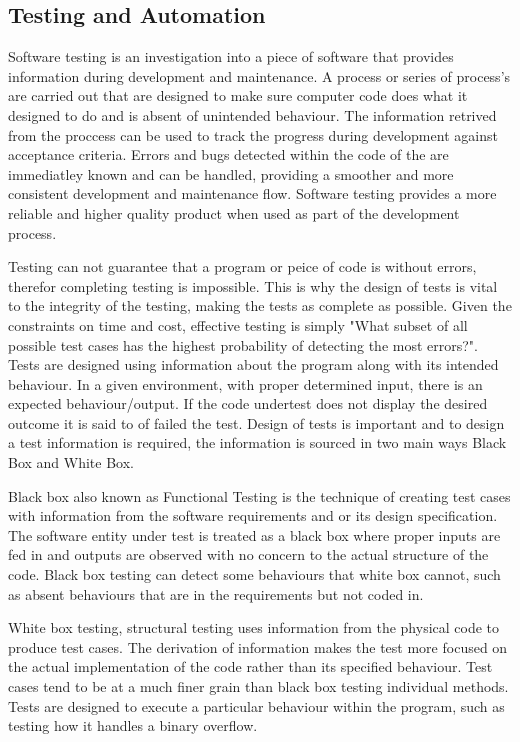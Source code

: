 \documentclass{article}
\begin{document}
\subsection{Testing and Automation}
\par Software testing is an investigation into a piece of software that provides information during development and maintenance. A process or series of process's are carried out that are designed to make sure computer code does what it designed to do and is absent of unintended behaviour. \cite{myers2011art}The information retrived from the proccess can be used to track the progress during development against acceptance criteria. Errors and bugs detected within the code of the are immediatley known and can be handled, providing a smoother and more consistent development and maintenance flow. Software testing provides a more reliable and higher quality product when used as part of the development process.
\par Testing can not guarantee that a program or peice of code is without errors, therefor completing testing is impossible. This is why the design of tests is vital to the integrity of the testing, making the tests as complete as possible. Given the constraints on time and cost, effective testing is simply "What subset of all possible test cases has the highest probability of detecting the most errors?"\cite{myers2011art}. Tests are designed using information about the program along with its intended behaviour. In a given environment, with proper determined input, there is an expected behaviour/output. If the code undertest does not display the desired outcome it is said to of failed the test. Design of tests is important and to design a test information is required, the information is sourced in two main ways Black Box and White Box.
\par Black box also known as Functional Testing is the technique of creating test cases with information from the software requirements and or its design specification. The software entity under test is treated as a black box where proper inputs are fed in and outputs are observed with no concern to the actual structure of the code. Black box testing can detect some behaviours that white box cannot, such as absent behaviours that are in the requirements but not coded in.\cite{nidhra2012blackbox}\cite{young2008software}
\par White box testing, structural testing uses information from the physical code to produce test cases. The derivation of information makes the test more focused on the actual implementation of the code rather than its specified behaviour. Test cases tend to be at a much finer grain than black box testing individual methods. Tests are designed to execute a particular behaviour within the program, such as testing how it handles a binary overflow.\cite{nidhra2012blackbox}\cite{young2008software}
\end{document}

